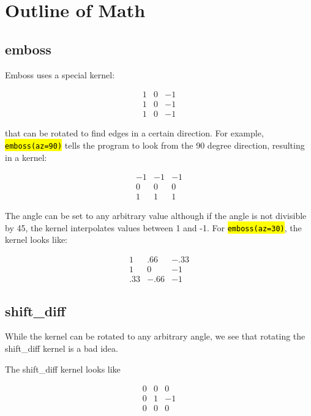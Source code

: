 \documentclass[10pt]{article}
\begin{document}

\section{Outline of Math}
    \subsection{emboss} %
    \label{sub:emboss}
    Emboss uses a special kernel:

    \[ \begin{array}{ccc}
    1 &  0 & -1 \\
    1 &  0 & -1 \\
    1 &  0 & -1 \end{array}\] 

     that can be rotated to find edges in a certain direction. For example, \hl{\texttt{emboss(az=90)}} tells the program to look from the 90 degree direction, resulting in a kernel:

     \[ \begin{array}{ccc}
    -1 & -1 & -1 \\
     0 &  0 &  0 \\
     1 &  1 &  1 \end{array}\] 

     The angle can be set to any arbitrary value although if the angle is not divisible by 45, the kernel interpolates values between 1 and -1. For \hl{\texttt{emboss(az=30)}}, the kernel looks like:

     \[ \begin{array}{ccc}
    1   & .66   & -.33 \\
    1   &  0    & -1 \\
     .33&  -.66 & -1 \end{array}\] 

    \subsection{shift\_diff} %
    \label{sub:shift_diff}

    While the kernel can be rotated to any arbitrary angle, we see that rotating the shift\_diff kernel is a bad idea. 

    The shift\_diff kernel looks like

    \[ \begin{array}{ccc}
    0   & 0  & 0 \\
    0   &  1 & -1 \\
    0   &  0 & 0 \end{array}\] 
\end{document}
